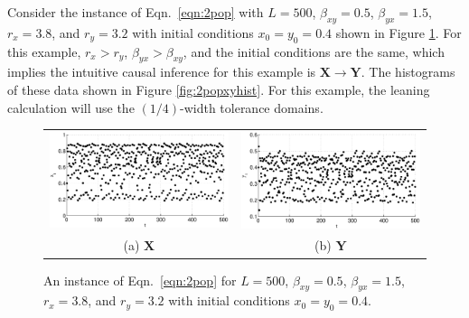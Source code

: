 \documentclass{article}[10pt]
\begin{document}
Consider the instance of Eqn.\ \ref{eqn:2pop} with $L=500$, $\beta_{xy} = 0.5$, $\beta_{yx} = 1.5$, $r_x = 3.8$, and $r_y = 3.2$ with initial conditions $x_0 = y_0 = 0.4$ shown in Figure \ref{fig:2popxyplot}.  For this example, $r_x>r_y$, $\beta_{yx}>\beta_{xy}$, and the initial conditions are the same, which implies the intuitive causal inference for this example is $\mathbf{X}\rightarrow\mathbf{Y}$.  The histograms of these data shown in Figure \ref{fig:2popxyhist}.  For this example, the leaning calculation will use the $(1/4)$-width tolerance domains.
\begin{figure}[ht]
\begin{tabular}{cc}
\includegraphics[scale=0.5]{CoupLogMapExample_X.eps} & \includegraphics[scale=0.5]{CoupLogMapExample_Y.eps} \\
(a) $\mathbf{X}$ & (b) $\mathbf{Y}$
\end{tabular}
\caption{An instance of Eqn.\ \ref{eqn:2pop} for $L=500$, $\beta_{xy} = 0.5$, $\beta_{yx} = 1.5$, $r_x = 3.8$, and $r_y = 3.2$ with initial conditions $x_0 = y_0 = 0.4$.}
\label{fig:2popxyplot}
\end{figure}
\end{document}
